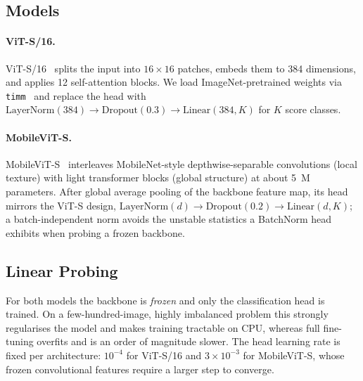 \documentclass[10pt,twocolumn,letterpaper]{article}
\begin{document}
\subsection{Models}
\paragraph{ViT-S/16.}
ViT-S/16~\cite{vit} splits the input into $16\times16$ patches, embeds them to
384 dimensions, and applies 12 self-attention blocks. We load
ImageNet-pretrained weights via \texttt{timm}~\cite{timm} and replace the head
with $\text{LayerNorm}(384)\!\to\!\text{Dropout}(0.3)\!\to\!\text{Linear}(384,K)$
for $K$ score classes.

\paragraph{MobileViT-S.}
MobileViT-S~\cite{mobilevit} interleaves MobileNet-style depthwise-separable
convolutions (local texture) with light transformer blocks (global structure)
at about 5~M parameters. After global average pooling of the backbone feature
map, its head mirrors the ViT-S design,
$\text{LayerNorm}(d)\!\to\!\text{Dropout}(0.2)\!\to\!\text{Linear}(d,K)$; a
batch-independent norm avoids the unstable statistics a BatchNorm head exhibits
when probing a frozen backbone.

\subsection{Linear Probing}
\label{sec:linprobe}
For both models the backbone is \emph{frozen} and only the classification head
is trained. On a few-hundred-image, highly imbalanced problem this strongly
regularises the model and makes training tractable on CPU, whereas full
fine-tuning overfits and is an order of magnitude slower. The head learning
rate is fixed per architecture: $10^{-4}$ for ViT-S/16 and
$3\!\times\!10^{-3}$ for MobileViT-S, whose frozen convolutional features
require a larger step to converge.
\end{document}
